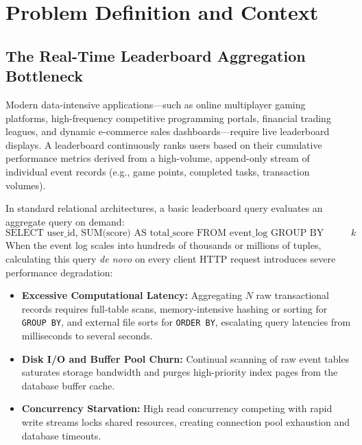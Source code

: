 \documentclass[11pt,a4paper]{report}
\begin{document}

\tableofcontents
\newpage


\section{Problem Definition and Context}

\subsection{The Real-Time Leaderboard Aggregation Bottleneck}
Modern data-intensive applications—such as online multiplayer gaming platforms, high-frequency competitive programming portals, financial trading leagues, and dynamic e-commerce sales dashboards—require live leaderboard displays. A leaderboard continuously ranks users based on their cumulative performance metrics derived from a high-volume, append-only stream of individual event records (e.g., game points, completed tasks, transaction volumes).

In standard relational architectures, a basic leaderboard query evaluates an aggregate query on demand:
$$\text{SELECT user\_id, SUM(score) AS total\_score FROM event\_log GROUP BY user\_id ORDER BY total\_score DESC LIMIT } k$$
When the event log scales into hundreds of thousands or millions of tuples, calculating this query \textit{de novo} on every client HTTP request introduces severe performance degradation:
\begin{itemize}
    \item \textbf{Excessive Computational Latency:} Aggregating $N$ raw transactional records requires full-table scans, memory-intensive hashing or sorting for \texttt{GROUP BY}, and external file sorts for \texttt{ORDER BY}, escalating query latencies from milliseconds to several seconds.
    \item \textbf{Disk I/O and Buffer Pool Churn:} Continual scanning of raw event tables saturates storage bandwidth and purges high-priority index pages from the database buffer cache.
    \item \textbf{Concurrency Starvation:} High read concurrency competing with rapid write streams locks shared resources, creating connection pool exhaustion and database timeouts.
\end{itemize}
\end{document}
